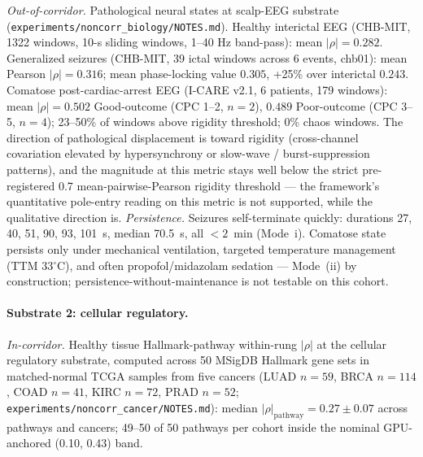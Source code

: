 \documentclass[11pt,a4paper]{article}
\begin{document}
\emph{Out-of-corridor.} Pathological neural states at scalp-EEG substrate (\texttt{experiments/noncorr\_biology/NOTES.md}). Healthy interictal EEG (CHB-MIT, 1322 windows, 10-s sliding windows, 1--40 Hz band-pass): mean $|\rho| = 0.282$. Generalized seizures (CHB-MIT, 39 ictal windows across 6 events, chb01): mean Pearson $|\rho| = 0.316$; mean phase-locking value $0.305$, +25\% over interictal $0.243$. Comatose post-cardiac-arrest EEG (I-CARE v2.1, 6 patients, 179 windows): mean $|\rho| = 0.502$ Good-outcome (CPC 1--2, $n=2$), $0.489$ Poor-outcome (CPC 3--5, $n=4$); 23--50\% of windows above rigidity threshold; 0\% chaos windows. The direction of pathological displacement is toward rigidity (cross-channel covariation elevated by hypersynchrony or slow-wave / burst-suppression patterns), and the magnitude at this metric stays well below the strict pre-registered 0.7 mean-pairwise-Pearson rigidity threshold --- the framework's quantitative pole-entry reading on this metric is not supported, while the qualitative direction is. \emph{Persistence.} Seizures self-terminate quickly: durations 27, 40, 51, 90, 93, 101~s, median 70.5~s, all $<2$~min (Mode~i). Comatose state persists only under mechanical ventilation, targeted temperature management (TTM 33$^{\circ}$C), and often propofol/midazolam sedation --- Mode~(ii) by construction; persistence-without-maintenance is not testable on this cohort.

\paragraph{Substrate 2: cellular regulatory.}

\emph{In-corridor.} Healthy tissue Hallmark-pathway within-rung $|\rho|$ at the cellular regulatory substrate, computed across 50 MSigDB Hallmark gene sets in matched-normal TCGA samples from five cancers (LUAD $n=59$, BRCA $n=114$, COAD $n=41$, KIRC $n=72$, PRAD $n=52$; \texttt{experiments/noncorr\_cancer/NOTES.md}): median $|\rho|_{\text{pathway}} = 0.27 \pm 0.07$ across pathways and cancers; 49--50 of 50 pathways per cohort inside the nominal GPU-anchored (0.10, 0.43) band.
\end{document}
